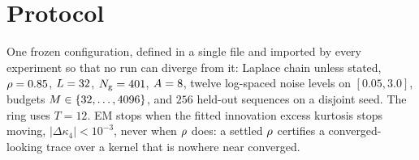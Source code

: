 \section{Protocol}
\label{app:protocol}

One frozen configuration, defined in a single file and imported by every experiment so that no run
can diverge from it: Laplace chain unless stated, $\rho=0.85$, $L=32$, $N_{\mathrm{g}}=401$,
$A=8$, twelve log-spaced noise levels on $[0.05,3.0]$, budgets
$M\in\{32,\dots,4096\}$, and $256$ held-out sequences on a disjoint seed. The ring uses
$T=12$. EM stops when the fitted innovation excess kurtosis stops moving,
$|\Delta\kappa_4|<10^{-3}$, never when $\rho$ does: a settled $\rho$ certifies a
converged-looking trace over a kernel that is nowhere near converged.
